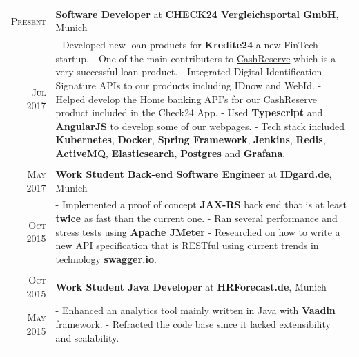 \documentclass[a4paper,13pt]{article}
\begin{document}
\begin{adjustwidth}{-3cm}{}
\begin{tabular}{r|p{17.5cm}}
				\textsc{Present} & \textbf{Software Developer} at \textbf{CHECK24 Vergleichsportal GmbH}, Munich \\
		\textsc{Jul 2017} & \footnotesize{
				- Developed new loan products for \textbf{Kredite24} a new FinTech startup.\newline
			- One of the main contributers to \href{https://www.check24.de/cashreserve/}{CashReserve} which is a very successful loan product. \newline
- Integrated Digital Identification Signature APIs to our products including IDnow and WebId. \newline
			- Helped develop the Home banking API's for our CashReserve product included in the Check24 App. \newline
			- Used \textbf{Typescript} and \textbf{AngularJS} to develop some of our webpages. \newline
			- Tech stack included \textbf{Kubernetes}, \textbf{Docker}, \textbf{Spring Framework}, \textbf{Jenkins}, \textbf{Redis}, \textbf{ActiveMQ}, \textbf{Elasticsearch}, \textbf{Postgres}
		 \newline
		 and \textbf{Grafana}.
	}
		\\ \multicolumn{2}{c}{}\\
		
\textsc{May 2017} & \textbf{Work Student Back-end Software Engineer} at \textbf{IDgard.de}, Munich \\
\textsc{Oct 2015} & \footnotesize{
	- Implemented a proof of concept \textbf{JAX-RS} back end that is at least \textbf{twice} as fast than the current one.\newline
	- Ran several performance and stress tests using \textbf{Apache JMeter} \newline
	- Researched on how to write a new API specification that is RESTful using current trends in technology \textbf{swagger.io}.
}
\\ \multicolumn{2}{c}{}\\


\textsc{Oct 2015} & \textbf{Work Student Java Developer} at \textbf{HRForecast.de}, Munich \\
\textsc{May 2015} & \footnotesize{ - Enhanced an analytics tool mainly written in Java with \textbf{Vaadin} framework. \newline
- Refracted the code base since it lacked extensibility and scalability.
} \\ 
\multicolumn{2}{c}{} \\


\end{tabular}
\end{adjustwidth}
\end{document}
